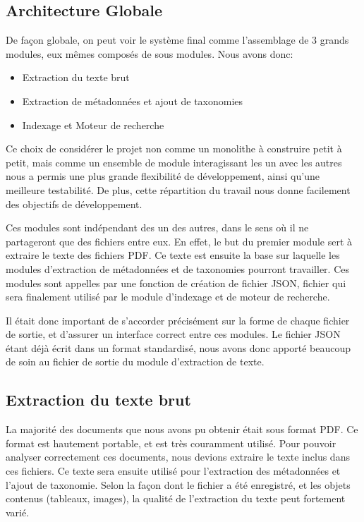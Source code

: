 

\subsection{Architecture Globale}
De façon globale, on peut voir le système final comme l'assemblage de 3 grands modules, eux mêmes composés de sous modules. 
Nous avons donc:
\begin{itemize}
	\item Extraction du texte brut
	\item Extraction de métadonnées et ajout de taxonomies
	\item Indexage et Moteur de recherche
\end{itemize}

Ce choix de considérer le projet non comme un monolithe à construire petit à petit, mais comme un ensemble de module interagissant les un avec les autres nous a permis une plus grande flexibilité de développement, ainsi qu'une meilleure testabilité. De plus, cette répartition du travail nous donne facilement des objectifs de développement. 

Ces modules sont indépendant des un des autres, dans le sens où il ne partageront que des fichiers entre eux.
En effet, le but du premier module sert à extraire le texte des fichiers PDF\@.
Ce texte est ensuite la base sur laquelle les modules d'extraction de métadonnées et de taxonomies pourront travailler.
Ces modules sont appelles par une fonction de création de fichier \gls{JSON}, fichier qui sera finalement utilisé par le module d'indexage et de moteur de recherche. 

Il était donc important de s'accorder précisément sur la forme de chaque fichier de sortie, et d'assurer un interface correct entre ces modules.
Le fichier JSON étant déjà écrit dans un format standardisé, nous avons donc apporté beaucoup de soin au fichier de sortie du module d'extraction de texte. 

\subsection{Extraction du texte brut}
La majorité des documents que nous avons pu obtenir était sous format PDF\@.
Ce format est hautement portable, et est très couramment utilisé.
Pour pouvoir analyser correctement ces documents, nous devions extraire le texte inclus dans ces fichiers.
Ce texte sera ensuite utilisé pour l'extraction des métadonnées et l'ajout de taxonomie.
Selon la façon dont le fichier a été enregistré, et les objets contenus (tableaux, images), la qualité de l'extraction du texte peut fortement varié. 

